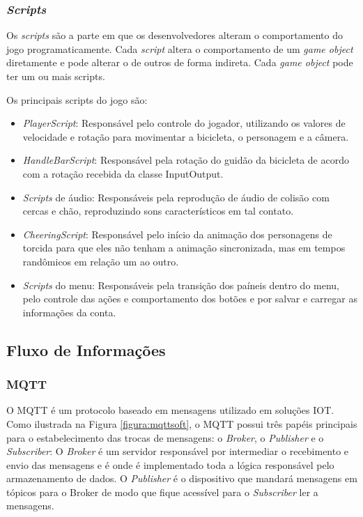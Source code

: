 \subsubsection{\textit{Scripts}}

Os \textit{scripts} são a parte em que os desenvolvedores alteram o comportamento do jogo programaticamente. Cada \textit{script} altera o comportamento de um \textit{game object} diretamente e pode alterar o de outros de forma indireta. Cada \textit{game object} pode ter um ou mais scripts.

Os principais scripts do jogo são:

\begin{itemize}
\item \textit{PlayerScript}: Responsável pelo controle do jogador, utilizando os valores de velocidade e rotação para movimentar a bicicleta, o personagem e a câmera.
\item \textit{HandleBarScript}: Responsável pela rotação do guidão da bicicleta de acordo com a rotação recebida da classe InputOutput.
\item \textit{Scripts} de áudio: Responsáveis pela reprodução de áudio de colisão com cercas e chão, reproduzindo sons característicos em tal contato.
\item \textit{CheeringScript}: Responsável pelo início da animação dos personagens de torcida para que eles não tenham a animação sincronizada, mas em tempos randômicos em relação um ao outro.
\item \textit{Scripts} do menu: Responsáveis pela transição dos paíneis dentro do menu, pelo controle das ações e comportamento dos botões e por salvar e carregar as informações da conta.
\end{itemize}

\subsection{Fluxo de Informa\c{c}ões}
\subsubsection{MQTT}

O MQTT é um protocolo baseado em mensagens utilizado em soluções IOT. Como ilustrada na Figura \ref{figura:mqttsoft}, o MQTT possui três papéis principais para o estabelecimento das trocas de mensagens: o \textit{Broker}, o \textit{Publisher} e o \textit{Subscriber}: O \textit{Broker} é um servidor responsável por intermediar o recebimento e envio das mensagens e é onde é implementado toda a lógica responsável pelo armazenamento de dados. O \textit{Publisher} é o dispositivo que mandará mensagens em tópicos para o Broker de modo que fique acessível para o \textit{Subscriber} ler a mensagens.

